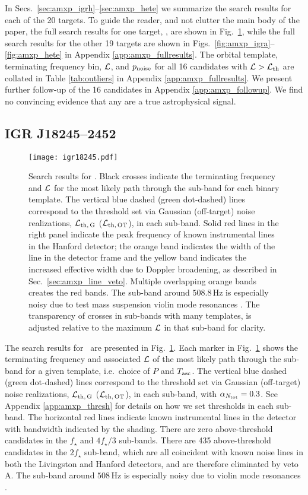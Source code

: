 In Secs.~\ref{sec:amxp_igrh}--\ref{sec:amxp_hete} we summarize the search results for each of the 20 targets. To guide the reader, and not clutter the main body of the paper, the full search results for one target, \igrh, are shown in Fig.~\ref{fig:amxp_igrh}, while the full search results for the other 19 targets are shown in Figs.~\ref{fig:amxp_igra}--\ref{fig:amxp_hete} in Appendix \ref{app:amxp_fullresults}. The orbital template, terminating frequency bin, $\mathcal{L}$, and $p_{\rm noise}$ for all 16 candidates with $\mathcal{L} > \mathcal{L}_{\rm th}$ are collated in Table \ref{tab:outliers} in Appendix \ref{app:amxp_fullresults}. We present further follow-up of the 16 candidates in Appendix \ref{app:amxp_followup}. We find no convincing evidence that any are a true astrophysical signal.

\subsection{IGR J18245--2452  \label{sec:amxp_igrh} }
\begin{figure*}
	\centering
	\texttt{[image: igr18245.pdf]}
	\caption{Search results for \igrh. Black crosses indicate the terminating frequency and $\mathcal{L}$ for the most likely path through the sub-band for each binary template. The vertical blue dashed (green dot-dashed) lines correspond to the threshold set via Gaussian (off-target) noise realizations, $\mathcal{L}_{\rm th,\,G}$ ($\mathcal{L}_{\rm th,\,OT}$), in each sub-band. Solid red lines in the right panel indicate the peak frequency of known instrumental lines in the Hanford detector; the orange band indicates the width of the line in the detector frame and the yellow band indicates the increased effective width due to Doppler broadening, as described in Sec.~\ref{sec:amxp_line_veto}. Multiple overlapping orange bands creates the red bands. The sub-band around $508.8\,$Hz is especially noisy due to test mass suspension violin mode resonances \cite{o23DetChar}. The transparency of crosses in sub-bands with many templates, is adjusted relative to the maximum $\mathcal{L}$ in that sub-band for clarity.}
	\label{fig:amxp_igrh}	
\end{figure*}
The search results for \igrh\ are presented in Fig.~\ref{fig:amxp_igrh}. Each marker in Fig.~\ref{fig:amxp_igrh} shows the terminating frequency and associated $\mathcal{L}$ of the most likely path through the sub-band for a given template, i.e.~choice of $P$ and $T_{\textrm{asc}}$. The vertical blue dashed (green dot-dashed) lines correspond to the threshold set via Gaussian (off-target) noise realizations, $\mathcal{L}_{\rm th,\,G}$ ($\mathcal{L}_{\rm th,\,OT}$), in each sub-band, with $\alpha_{N_{\rm tot}} = 0.3$. See Appendix \ref{app:amxp_thresh} for details on how we set thresholds in each sub-band. The horizontal red lines indicate known instrumental lines in the detector with bandwidth indicated by the shading. There are zero above-threshold candidates in the $f_\star$ and $4f_\star / 3$ sub-bands. There are 435 above-threshold candidates in the $2f_\star$ sub-band, which are all coincident with known noise lines in both the Livingston and Hanford detectors, and are therefore eliminated by veto A. The sub-band around $508\,$Hz is especially noisy due to violin mode resonances \cite{o23DetChar}.

